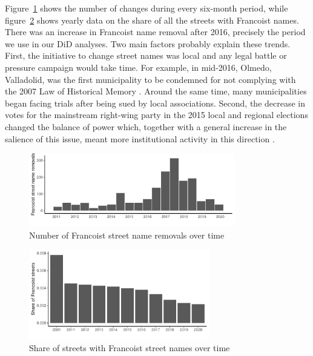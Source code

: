 \documentclass[12pt, notitlepage]{article}
\begin{document}
Figure~\ref{fig:changes_time} shows the number of changes during every six-month period, while figure~\ref{fig:fs_year} shows yearly data on the share of all the streets with Francoist names.
There was an increase in Francoist name removal after 2016, precisely the period we use in our DiD analyses.
Two main factors probably explain these trends.
First, the initiative to change street names was local and any legal battle or pressure campaign would take time.
For example, in mid-2016, Olmedo, Valladolid, was the first municipality to be condemned for not complying with the 2007 Law of Historical Memory \citep{El-Norte-de-Castilla:2016aa}.
Around the same time, many municipalities began facing trials after being sued by local associations.
Second, the decrease in votes for the mainstream right-wing party in the 2015 local and regional elections changed the balance of power which, together with a general increase in the salience of this issue, meant more institutional activity in this direction \citep[e.g.][]{Vazquez:2016aa, El-Comercio:2016ab}.

\begin{figure}[htb!]
\centering

  \includegraphics[width = 0.8\textwidth]{img/changes_by_year}

  \caption{Number of Francoist street name removals over time}\label{fig:changes_time}

\end{figure}

\begin{figure}[htb!]
\centering

  \includegraphics[width = 0.7\textwidth]{img/fs_by_year}

  \caption{Share of streets with Francoist street names over time}\label{fig:fs_year}

\end{figure}
\end{document}

